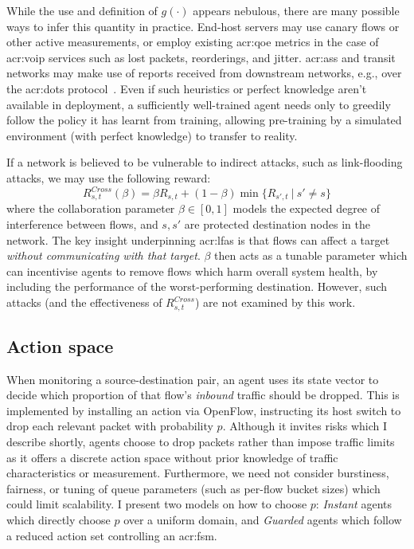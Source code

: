 While the use and definition of $g(\cdot)$ appears nebulous, there are many possible ways to infer this quantity in practice.
End-host servers may use canary flows or other active measurements, or employ existing \gls{acr:qoe} metrics in the case of \gls{acr:voip} services such as lost packets, reorderings, and jitter.
\glspl{acr:as} and transit networks may make use of reports received from downstream networks, e.g., over the \gls{acr:dots} protocol~\parencite{ietf-dots-use-cases-17}.
Even if such heuristics or perfect knowledge aren't available in deployment, a sufficiently well-trained agent needs only to greedily follow the policy it has learnt from training, allowing pre-training by a simulated environment (with perfect knowledge) to transfer to reality.

If a network is believed to be vulnerable to indirect attacks, such as link-flooding attacks, we may use the following reward:
\begin{equation}
	R_{s,t}^{\mathit{Cross}}(\beta) = \beta R_{s,t} + (1 - \beta) \min{\{R_{s',t}~|~s' \ne s\}} \label{eqn:lfa-reward}
\end{equation}
where the collaboration parameter $\beta \in [0,1]$ models the expected degree of interference between flows, and $s, s'$ are protected destination nodes in the network.
The key insight underpinning \glspl{acr:lfa} is that flows can affect a target \emph{without communicating with that target}.
$\beta$ then acts as a tunable parameter which can incentivise agents to remove flows which harm overall system health, by including the performance of the worst-performing destination.
However, such attacks (and the effectiveness of $R_{s,t}^{\mathit{Cross}}$) are not examined by this work.

\subsection{Action space}\label{sec:ddos-action-space-risks}
When monitoring a source-destination pair, an agent uses its state vector to decide which proportion of that flow's \emph{inbound} traffic should be dropped.
This is implemented by installing an action via OpenFlow, instructing its host switch to drop each relevant packet with probability $p$.
Although it invites risks which I describe shortly, agents choose to drop packets rather than impose traffic limits as it offers a discrete action space without prior knowledge of traffic characteristics or measurement.
Furthermore, we need not consider burstiness, fairness, or tuning of queue parameters (such as per-flow bucket sizes) which could limit scalability.
I present two models on how to choose $p$: \emph{Instant} agents which directly choose $p$ over a uniform domain, and \emph{Guarded} agents which follow a reduced action set controlling an \gls{acr:fsm}.

